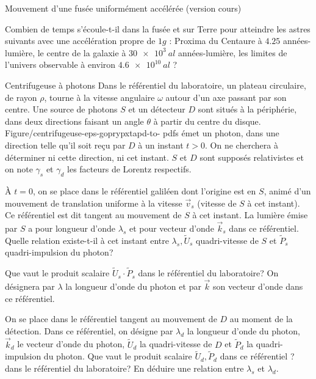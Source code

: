 \begin{exo}[PC][2][TD]{Mouvement d’une fusée uniformément accélérée (version cours)}
\begin{quest}
    \item Combien de temps s'écoule-t-il dans la fusée et sur Terre pour atteindre les astres suivants avec une accélération propre de $1g$ : Proxima du Centaure à $\num{4.25}$ années-lumière, le centre de la galaxie à $\SI{30e3}{al}$ années-lumière, les limites de l'univers observable à environ $\SI{4.6e10}{al}$ ?
  \end{quest}
\end{exo}



\begin{exo}[PC][1][colle]{Centrifugeuse à photons}
Dans le référentiel du laboratoire, un plateau circulaire, de rayon $\rho$, tourne à la vitesse angulaire $\omega$ autour d'un axe passant par son centre. Une source de photons $S$ et un détecteur $D$ sont situés à la périphérie, dans deux directions faisant un angle $\theta$ à partir du centre du disque.
Figure/centrifugeuse-eps-goprypxtapd-to- pdfs émet un photon, dans une direction telle qu'il soit reçu par $D$ à un instant $t>0$. On ne cherchera à déterminer ni cette direction, ni cet instant. $S$ et $D$ sont supposés relativistes et on note $\gamma_s$ et $\gamma_d$ les facteurs de Lorentz respectifs.
\begin{quest}
  \item À $t=0$, on se place dans le référentiel galiléen dont l'origine est en $S$, animé d'un mouvement de translation uniforme à la vitesse $\vec{v}_s$ (vitesse de $S$ à cet instant). Ce référentiel est dit tangent au mouvement de $S$ à cet instant. La lumière émise par $S$ a pour longueur d'onde $\lambda_s$ et pour vecteur d'onde $\vec{k}_s$ dans ce référentiel. Quelle relation existe-t-il à cet instant entre $\lambda_s, \widetilde{U}_s$ quadri-vitesse de $S$ et $\widetilde{P}_s$ quadri-impulsion du photon?
  \item Que vaut le produit scalaire $\widetilde{U}_s \cdot \widetilde{P}_s$ dans le référentiel du laboratoire? On désignera par $\lambda$ la longueur d'onde du photon et par $\vec{k}$ son vecteur d'onde dans ce référentiel.
  \item On se place dans le référentiel tangent au mouvement de $D$ au moment de la détection. Dans ce référentiel, on désigne par $\lambda_d$ la longueur d'onde du photon, $\vec{k}_d$ le vecteur d'onde du photon, $\widetilde{U}_d$ la quadri-vitesse de $D$ et $\widetilde{P}_d$ la quadri-impulsion du photon. Que vaut le produit scalaire $\widetilde{U}_d, \widetilde{P}_d$ dans ce référentiel ? dans le référentiel du laboratoire? En déduire une relation entre $\lambda_s$ et $\lambda_d$.
\end{quest}
  
\end{exo}

